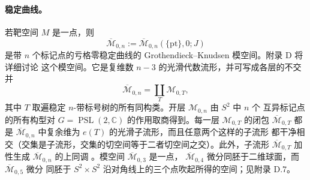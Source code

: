 \paragraph{稳定曲线。}
若靶空间 $M$ 是一点，则
\[
  \overline{\mathcal M}_{0,n}
  :=\overline{\mathcal M}_{0,n}(\{\mathrm{pt}\},0;J)
\]
是带 $n$ 个标记点的亏格零稳定曲线的 Grothendieck--Knudsen 模空间。附录 D 将详细讨论
这个模空间。它是复维数 $n-3$ 的光滑代数流形，并可写成各层的不交并
\[
  \overline{\mathcal M}_{0,n}=\coprod_T\mathcal M_{0,T},
\]
其中 $T$ 取遍稳定 $n$-带标号树的所有同构类。开层 $\mathcal M_{0,n}$ 由 $S^2$ 中 $n$ 个
互异标记点的所有构型对 $G=\operatorname{PSL}(2,\mathbb C)$ 的作用取商得到。每一层
$\mathcal M_{0,T}$ 的闭包 $\overline{\mathcal M}_{0,T}$ 都是
$\overline{\mathcal M}_{0,n}$ 中复余维为 $e(T)$ 的光滑子流形，而且任意两个这样的子流形
都干净相交（交集是子流形，交集的切空间等于二者切空间之交）。此外，子流形
$\overline{\mathcal M}_{0,T}$ 加性生成 $\overline{\mathcal M}_{0,n}$ 的上同调
。模空间 $\overline{\mathcal M}_{0,3}$ 是一点，
$\overline{\mathcal M}_{0,4}$ 微分同胚于二维球面，而 $\overline{\mathcal M}_{0,5}$ 微分
同胚于 $S^2\times S^2$ 沿对角线上的三个点吹起所得的空间；见附录 D.7。

